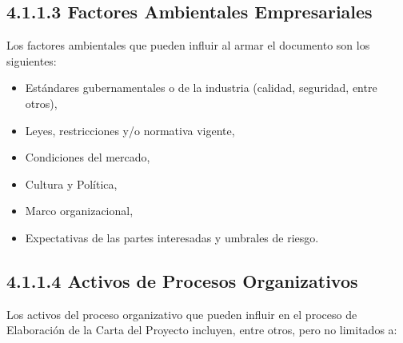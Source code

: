 \documentclass[letterpaper,12pt,openright,oneside]{article}
\theoremstyle{plain}
\begin{document}
\subsection*{4.1.1.3 Factores Ambientales Empresariales}

Los factores ambientales que pueden influir al armar el documento son los siguientes:

\begin{itemize}
    \item Estándares gubernamentales o de la industria (calidad, seguridad, entre otros),
    \item Leyes, restricciones y/o normativa vigente,
    \item Condiciones del mercado,
    \item Cultura y Política,
    \item Marco organizacional,
    \item Expectativas de las partes interesadas y umbrales de riesgo.
\end{itemize}
% 
% 
\subsection*{4.1.1.4 Activos de Procesos Organizativos}

Los activos del proceso organizativo que pueden influir en el proceso de Elaboración de la Carta del Proyecto incluyen, entre otros, pero no limitados a:
\end{document}
